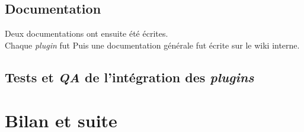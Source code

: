 \subsection{Documentation}
Deux documentations ont ensuite été écrites.\\
Chaque \textit{plugin} fut
Puis une documentation générale fut écrite sur le wiki interne. 

\subsection{Tests et \textit{QA} de l'intégration des \textit{plugins}}


\section{Bilan et suite}

